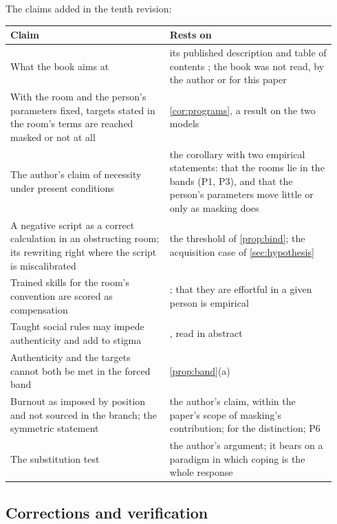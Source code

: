 \noindent The claims added in the tenth revision:
\begin{center}\small
\begin{tabular}{p{0.46\linewidth} p{0.48\linewidth}}
\toprule
Claim & Rests on \\
\midrule
What the book aims at & its published description and table of contents \cite{GoldsteinBrooks2026}; the book was not read, by the author or for this paper \\
With the room and the person's parameters fixed, targets stated in the room's terms are reached masked or not at all & \autoref{cor:programs}, a result on the two models \\
The author's claim of necessity under present conditions & the corollary with two empirical statements: that the rooms lie in the bands (P1, P3), and that the person's parameters move little or only as masking does \\
A negative script as a correct calculation in an obstructing room; its rewriting right where the script is miscalibrated & the threshold of \autoref{prop:bind}; the acquisition case of \autoref{sec:hypothesis} \\
Trained skills for the room's convention are scored as compensation & \cite{Hull2019, Livingston2019}; that they are effortful in a given person is empirical \\
Taught social rules may impede authenticity and add to stigma & \cite{BottemaBeutel2018}, read in abstract \\
Authenticity and the targets cannot both be met in the forced band & \autoref{prop:band}(a) \\
Burnout as imposed by position and not sourced in the branch; the symmetric statement & the author's claim, within the paper's scope of masking's contribution; \cite{Oliver1990, Botha2020} for the distinction; P6 \\
The substitution test & the author's argument; it bears on a paradigm in which coping is the whole response \\
\bottomrule
\end{tabular}
\end{center}

\subsection{Corrections and verification}

